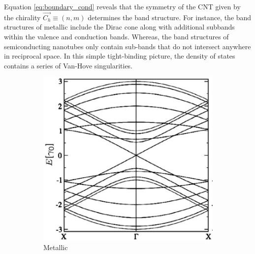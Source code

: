 Equation \ref{eq:boundary_cond} reveals that the symmetry of the CNT given by the chirality $\vec{C_h} \equiv (n,m)$ determines the band structure. For instance, the band structures of metallic include the Dirac cone along with additional subbands within the valence and conduction bands. Whereas, the band structures of semiconducting nanotubes only contain sub-bands that do not intersect anywhere in reciprocal space. In this simple tight-binding picture, the density of states contains a series of Van-Hove singularities.
 
\begin{figure}[h]
	\centering
	\begin{subfigure}{0.45\textwidth}
		\centering
		\includegraphics[scale=0.36]{images/chapter_optical_props/nine_zero_band_charlier_2}
		\caption{Metallic}
	\end{subfigure}
	\qquad
	\begin{subfigure}{0.45\textwidth}
		\centering

\end{subfigure}
\end{figure}
